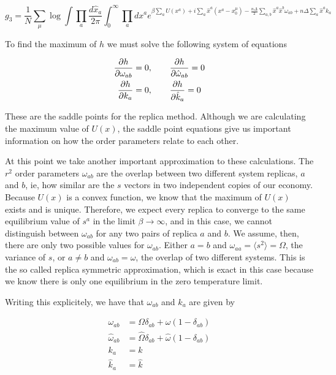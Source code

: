 \begin{equation}
  \label{eq:a_42}
  g_3 = \frac{1}{N} \sum_\mu \log \int \prod_a \frac{d\hat{x}_a}{2\pi}
  \int_0^\infty \prod_a dx^a e^{\beta \sum_a U(x^a) + i \sum_a
    \hat{x}^a(x^a-x_0^\mu) - \frac{n\Delta}{2} \sum_{a,b} \hat{x}^a
    \hat{x}^b \omega_{ab} + n\Delta \sum_a \hat{x}^a k_a }
\end{equation}

To find the maximum of $h$ we must solve the following system of equations

\begin{align}
  \label{eq:a_43}
  \frac{\partial h}{\partial \omega_{ab}}& = 0, \quad \quad \frac{\partial h}{\partial
    \hat{\omega}_{ab}} = 0 \nonumber \\     \frac{\partial h}{\partial
    k_{a}}& = 0, \quad \quad  \frac{\partial h}{\partial \hat{k}_a}= 0 
\end{align}

These are the saddle points for the replica method. Although we are calculating the maximum value of $U(x)$, the saddle point equations give us important information on how the order parameters relate to each other.

At this point we take another important approximation to these calculations. The $r^2$ order parameters $\omega_{ab}$ are the overlap between two different system replicas, $a$ and $b$, ie, how similar are the $s$ vectors in two independent copies of our economy. Because $U(x)$ is a convex function, we know that the maximum of $U(x)$ exists and is unique. Therefore, we expect every replica to converge to the same equilibrium value of $s^a$ in the limit $\beta \to \infty$, and in this case, we cannot distinguish between $\omega_{ab}$ for any two pairs of replica $a$ and $b$. We assume, then, there are only two possible values for $\omega_{ab}$. Either $a = b$ and $\omega_{aa} = \langle s^2 \rangle = \Omega$, the variance of $s$, or $a \neq b$ and $\omega_{ab} = \omega$, the overlap of two different systems. This is the so called replica symmetric approximation, which is exact in this case because we know there is only one equilibrium in the zero temperature limit.

Writing this explicitely, we have that $\omega_{ab}$ and $k_a$ are given by

\begin{align}
  \label{eq:a_44}
  \omega_{ab} & = \Omega \delta_{ab} + \omega (1 - \delta_{ab})
  \nonumber \\
  \hat{\omega}_{ab} & = \hat{\Omega} \delta_{ab} + \hat{\omega}
  (1-\delta_{ab}) \nonumber \\
  k_a & = k \\
  \hat{k}_a & = \hat{k} \nonumber
\end{align}

